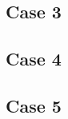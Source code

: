 \documentclass[../main.tex]{subfiles}
\begin{document}
\subsection{Case 3}
\label{sec:results-case1}

\subsection{Case 4}
\label{sec:results-case1}

\subsection{Case 5}
\label{sec:results-case1}

\end{document}

